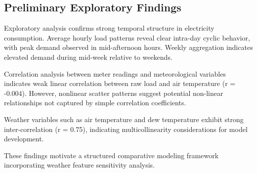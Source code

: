 \documentclass[conference]{IEEEtran}
\begin{document}
\subsection{Preliminary Exploratory Findings}

Exploratory analysis confirms strong temporal structure in electricity consumption. Average hourly load patterns reveal clear intra-day cyclic behavior, with peak demand observed in mid-afternoon hours. Weekly aggregation indicates elevated demand during mid-week relative to weekends.

Correlation analysis between meter readings and meteorological variables indicates weak linear correlation between raw load and air temperature (r = -0.004). However, nonlinear scatter patterns suggest potential non-linear relationships not captured by simple correlation coefficients.

Weather variables such as air temperature and dew temperature exhibit strong inter-correlation (r = 0.75), indicating multicollinearity considerations for model development.

These findings motivate a structured comparative modeling framework incorporating weather feature sensitivity analysis.





\end{document}
